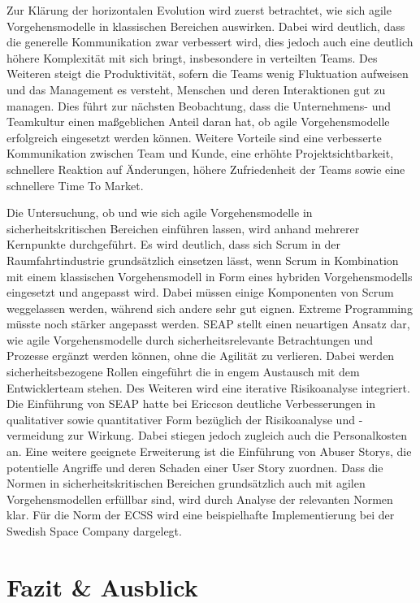 Zur Klärung der horizontalen Evolution wird zuerst betrachtet, wie sich agile Vorgehensmodelle in klassischen Bereichen auswirken.
Dabei wird deutlich, dass die generelle Kommunikation zwar verbessert wird, dies jedoch auch eine deutlich höhere Komplexität mit sich bringt, insbesondere in verteilten Teams.
Des Weiteren steigt die Produktivität, sofern die Teams wenig Fluktuation aufweisen und das Management es versteht, Menschen und deren Interaktionen gut zu managen.
Dies führt zur nächsten Beobachtung, dass die Unternehmens- und Teamkultur einen maßgeblichen Anteil daran hat, ob agile Vorgehensmodelle erfolgreich eingesetzt werden können.
Weitere Vorteile sind eine verbesserte Kommunikation zwischen Team und Kunde, eine erhöhte Projektsichtbarkeit, schnellere Reaktion auf Änderungen, höhere Zufriedenheit der Teams sowie eine schnellere Time To Market.

Die Untersuchung, ob und wie sich agile Vorgehensmodelle in sicherheitskritischen Bereichen einführen lassen, wird anhand mehrerer Kernpunkte durchgeführt.
Es wird deutlich, dass sich Scrum in der Raumfahrtindustrie grundsätzlich einsetzen lässt, wenn Scrum in Kombination mit einem klassischen Vorgehensmodell in Form eines hybriden Vorgehensmodells eingesetzt und angepasst wird.
Dabei müssen einige Komponenten von Scrum weggelassen werden, während sich andere sehr gut eignen.
Extreme Programming müsste noch stärker angepasst werden.
SEAP stellt einen neuartigen Ansatz dar, wie agile Vorgehensmodelle durch sicherheitsrelevante Betrachtungen und Prozesse ergänzt werden können, ohne die Agilität zu verlieren.
Dabei werden sicherheitsbezogene Rollen eingeführt die in engem Austausch mit dem Entwicklerteam stehen.
Des Weiteren wird eine iterative Risikoanalyse integriert.
Die Einführung von SEAP hatte bei Ericcson deutliche Verbesserungen in qualitativer sowie quantitativer Form bezüglich der Risikoanalyse und -vermeidung zur Wirkung. 
Dabei stiegen jedoch zugleich auch die Personalkosten an.
Eine weitere geeignete Erweiterung ist die Einführung von Abuser Storys, die potentielle Angriffe und deren Schaden einer User Story zuordnen.
Dass die Normen in sicherheitskritischen Bereichen grundsätzlich auch mit agilen Vorgehensmodellen erfüllbar sind, wird durch Analyse der relevanten Normen klar.
Für die Norm der ECSS wird eine beispielhafte Implementierung bei der Swedish Space Company dargelegt.

\section{Fazit \& Ausblick}

